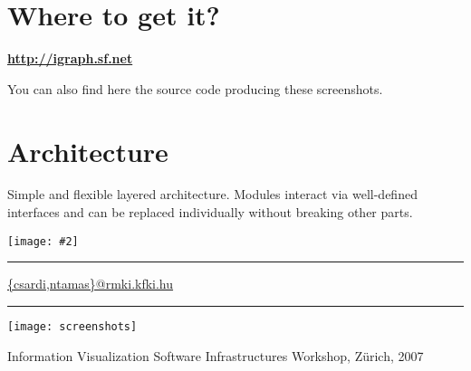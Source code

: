 \documentclass[a3]{sciposter}
\newcommand{\figfigure}[2]{%
  \texttt{[image: \#2]}
}
\begin{document}
\begin{multicols}{3}
\section{Where to get it?}
\centerline{\bf \url{http://igraph.sf.net}}

You can also find here the source code producing these screenshots.

\vfill\columnbreak
\section{Architecture}

Simple and flexible layered architecture.
Modules interact via well-defined interfaces and 
can be replaced individually without breaking other parts.

\begin{center}
\figfigure{\columnwidth}{arch}
\end{center}


\hrule
\vfill
\url{{csardi,ntamas}@rmki.kfki.hu}
\end{multicols}

\vfill
\hrule
\vfill

\centerline{\texttt{[image: screenshots]}}
\vspace*{-0.3cm}
\centerline{\small Information Visualization Software Infrastructures Workshop, Z\"urich, 2007}
\vfill
\end{document}
